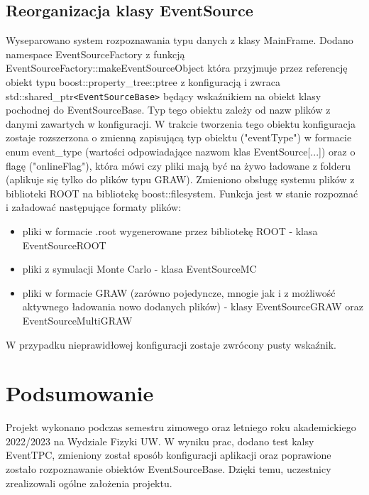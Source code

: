 \documentclass{article}
\begin{document}
\subsection{Reorganizacja klasy EventSource}

Wyseparowano system rozpoznawania typu danych z klasy MainFrame. Dodano namespace EventSourceFactory z funkcją EventSourceFactory::makeEventSourceObject która przyjmuje przez referencję obiekt typu
boost::property\_tree::ptree z konfiguracją i zwraca std::shared\_ptr\texttt{<EventSourceBase>} będący wskaźnikiem na obiekt klasy pochodnej do EventSourceBase. Typ tego obiektu zależy od nazw plików z danymi zawartych w konfiguracji. W trakcie tworzenia tego obiektu konfiguracja zostaje rozszerzona o zmienną zapisującą typ obiektu ("eventType") w formacie enum event\_type (wartości odpowiadające nazwom klas EventSource[...]) oraz o flagę ("onlineFlag"), która mówi czy pliki mają być na żywo ładowane z folderu (aplikuje się tylko do plików typu GRAW). Zmieniono obsługę systemu plików z biblioteki ROOT na bibliotekę boost::filesystem. Funkcja jest w stanie rozpoznać i załadować następujące formaty plików:
\begin{itemize}
    \item pliki w formacie .root wygenerowane przez bibliotekę ROOT - klasa EventSourceROOT
    \item pliki z symulacji Monte Carlo - klasa EventSourceMC
    \item pliki w formacie GRAW (zarówno pojedyncze, mnogie jak i z możliwość aktywnego ładowania nowo       dodanych plików) - klasy EventSourceGRAW oraz EventSourceMultiGRAW
\end{itemize}
W przypadku nieprawidłowej konfiguracji zostaje zwrócony pusty wskaźnik.
\section{Podsumowanie}
Projekt wykonano podczas semestru zimowego oraz letniego roku akademickiego 2022/2023 na Wydziale Fizyki UW. W wyniku prac, dodano test kalsy EventTPC, zmieniony został sposób konfiguracji aplikacji oraz poprawione zostało rozpoznawanie obiektów EventSourceBase. Dzięki temu, uczestnicy zrealizowali ogólne założenia projektu.

\pagebreak
\end{document}
